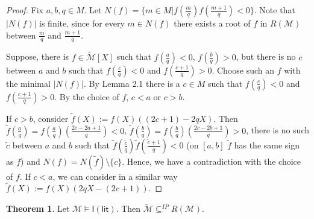 \documentclass[a4paper,14pt]{article}
\theoremstyle{definition}
\theoremstyle{theorem}
\newtheorem{theorem}{Theorem}[section]
\theoremstyle{lemma}
\theoremstyle{proposition}
\theoremstyle{remark}
\theoremstyle{corollary}
\theoremstyle{problem}
\theoremstyle{hypothesis}
\begin{document}
\begin{proof}
    Fix $a, b, q \in M$. Let $N(f) = \{m \in M|f(\frac{m}{q}) f(\frac{m + 1}{q}) < 0\}$. Note that $|N(f)|$ is finite, since for every $m \in N(f)$ there exists a root of $f$ in $R(\mathcal M)$ between $\frac{m}{q}$ and $\frac{m + 1}{q}$. 
    
    Suppose, there is $f \in \widetilde{\mathcal M}[X]$ such that $f(\frac{a}{q}) < 0$, $f(\frac{b}{q}) > 0$, but there is no $c$ between $a$ and $b$ such that $f(\frac{c}{q}) < 0$ and $f(\frac{c + 1}{q}) > 0$. Choose such an $f$ with the minimal $|N(f)|$. By Lemma 2.1 there is a $c \in M$ such that $f(\frac{c}{q}) < 0$ and $f(\frac{c + 1}{q}) > 0$. By the choice of $f$, $c < a$ or $c > b$.
    
    If $c > b$, consider $\tilde f(X) := f(X)((2 c + 1) - 2 q X)$. Then $\tilde f(\frac{a}{q}) = f(\frac{a}{q})(\frac{2 c - 2 a + 1}{q}) < 0$, $\tilde f(\frac{b}{q}) = f(\frac{b}{q})(\frac{2 c - 2 b + 1}{q}) > 0$, there is no such $\tilde c$ between $a$ and $b$ such that $\tilde f(\frac{\tilde c}{q}) \tilde f(\frac{\tilde c + 1}{q}) < 0$ (on $[a, b]$ $\tilde f$ has the same sign as $f$) and $N(f) = N(\tilde f) \setminus \{c\}$. Hence, we have a contradiction with the choice of $f$. If $c < a$, we can consider in a similar way $\tilde f(X) := f(X)(2 q X - (2 c + 1))$.
\end{proof}

\begin{theorem}
    Let $\mathcal M \vDash \mathsf{I(lit)}$. Then $\widetilde{\mathcal M} \subseteq^{IP} R(\mathcal M)$.
\end{theorem}
\end{document}

